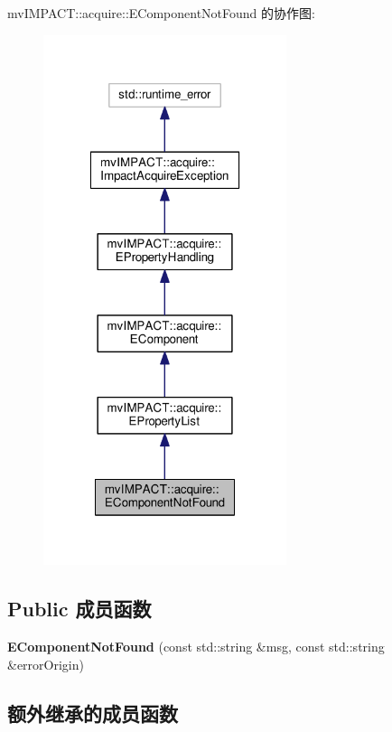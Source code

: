 mv\+I\+M\+P\+A\+C\+T\+:\+:acquire\+:\+:E\+Component\+Not\+Found 的协作图\+:
\nopagebreak
\begin{figure}[H]
\begin{center}
\leavevmode
\includegraphics[width=202pt]{classmv_i_m_p_a_c_t_1_1acquire_1_1_e_component_not_found__coll__graph}
\end{center}
\end{figure}
\subsection*{Public 成员函数}
\begin{DoxyCompactItemize}
\item 
\hypertarget{classmv_i_m_p_a_c_t_1_1acquire_1_1_e_component_not_found_a9a4197be8f07a2d880359a322a099219}{{\bfseries E\+Component\+Not\+Found} (const std\+::string \&msg, const std\+::string \&error\+Origin)}\label{classmv_i_m_p_a_c_t_1_1acquire_1_1_e_component_not_found_a9a4197be8f07a2d880359a322a099219}

\end{DoxyCompactItemize}
\subsection*{额外继承的成员函数}


